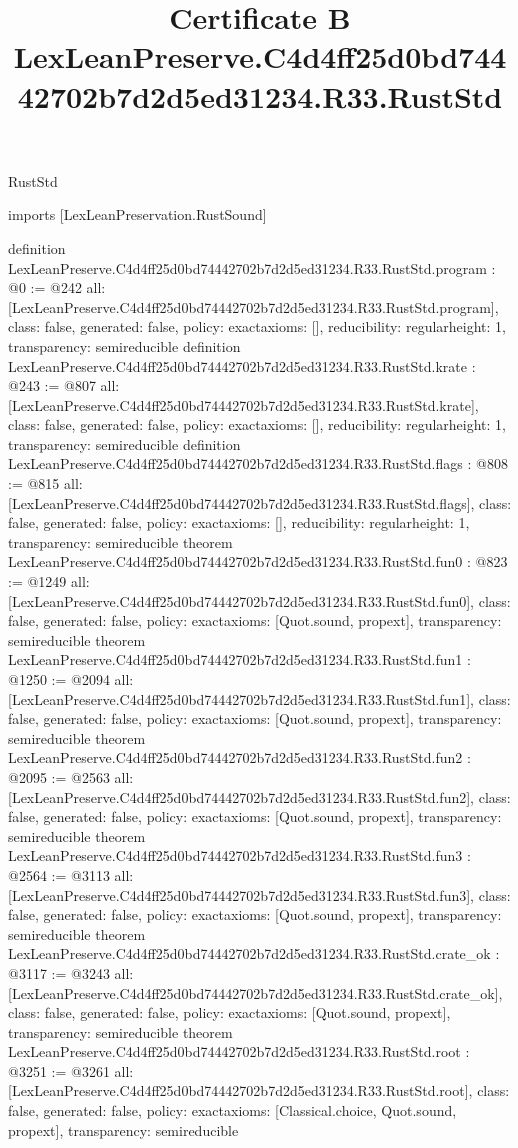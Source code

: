 \begin{lexlean}{RustStd}
\title{Certificate B LexLeanPreserve.C4d4ff25d0bd74442702b7d2d5ed31234.R33.RustStd}
\begin{coremodule}
imports [LexLeanPreservation.RustSound]

definition LexLeanPreserve.C4d4ff25d0bd74442702b7d2d5ed31234.R33.RustStd.program : @0 := @242 {
  all: [LexLeanPreserve.C4d4ff25d0bd74442702b7d2d5ed31234.R33.RustStd.program],
  class: false,
  generated: false,
  policy: exact{axioms: []},
  reducibility: regular{height: 1},
  transparency: semireducible
}
definition LexLeanPreserve.C4d4ff25d0bd74442702b7d2d5ed31234.R33.RustStd.krate : @243 := @807 {
  all: [LexLeanPreserve.C4d4ff25d0bd74442702b7d2d5ed31234.R33.RustStd.krate],
  class: false,
  generated: false,
  policy: exact{axioms: []},
  reducibility: regular{height: 1},
  transparency: semireducible
}
definition LexLeanPreserve.C4d4ff25d0bd74442702b7d2d5ed31234.R33.RustStd.flags : @808 := @815 {
  all: [LexLeanPreserve.C4d4ff25d0bd74442702b7d2d5ed31234.R33.RustStd.flags],
  class: false,
  generated: false,
  policy: exact{axioms: []},
  reducibility: regular{height: 1},
  transparency: semireducible
}
theorem LexLeanPreserve.C4d4ff25d0bd74442702b7d2d5ed31234.R33.RustStd.fun0 : @823 := @1249 {
  all: [LexLeanPreserve.C4d4ff25d0bd74442702b7d2d5ed31234.R33.RustStd.fun0],
  class: false,
  generated: false,
  policy: exact{axioms: [Quot.sound, propext]},
  transparency: semireducible
}
theorem LexLeanPreserve.C4d4ff25d0bd74442702b7d2d5ed31234.R33.RustStd.fun1 : @1250 := @2094 {
  all: [LexLeanPreserve.C4d4ff25d0bd74442702b7d2d5ed31234.R33.RustStd.fun1],
  class: false,
  generated: false,
  policy: exact{axioms: [Quot.sound, propext]},
  transparency: semireducible
}
theorem LexLeanPreserve.C4d4ff25d0bd74442702b7d2d5ed31234.R33.RustStd.fun2 : @2095 := @2563 {
  all: [LexLeanPreserve.C4d4ff25d0bd74442702b7d2d5ed31234.R33.RustStd.fun2],
  class: false,
  generated: false,
  policy: exact{axioms: [Quot.sound, propext]},
  transparency: semireducible
}
theorem LexLeanPreserve.C4d4ff25d0bd74442702b7d2d5ed31234.R33.RustStd.fun3 : @2564 := @3113 {
  all: [LexLeanPreserve.C4d4ff25d0bd74442702b7d2d5ed31234.R33.RustStd.fun3],
  class: false,
  generated: false,
  policy: exact{axioms: [Quot.sound, propext]},
  transparency: semireducible
}
theorem LexLeanPreserve.C4d4ff25d0bd74442702b7d2d5ed31234.R33.RustStd.crate_ok : @3117 := @3243 {
  all: [LexLeanPreserve.C4d4ff25d0bd74442702b7d2d5ed31234.R33.RustStd.crate_ok],
  class: false,
  generated: false,
  policy: exact{axioms: [Quot.sound, propext]},
  transparency: semireducible
}
theorem LexLeanPreserve.C4d4ff25d0bd74442702b7d2d5ed31234.R33.RustStd.root : @3251 := @3261 {
  all: [LexLeanPreserve.C4d4ff25d0bd74442702b7d2d5ed31234.R33.RustStd.root],
  class: false,
  generated: false,
  policy: exact{axioms: [Classical.choice, Quot.sound, propext]},
  transparency: semireducible
}


\end{coremodule}
\end{lexlean}
